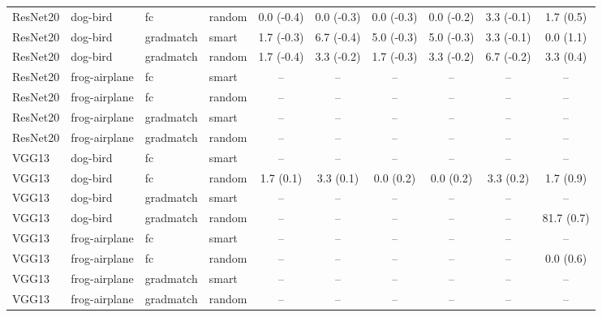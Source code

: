 \begin{table}[t]
{\begin{tabular}{llllcccccc}
ResNet20 & dog-bird & fc & random
& 0.0 (-0.4)
& 0.0 (-0.3)
& 0.0 (-0.3)
& 0.0 (-0.2)
& 3.3 (-0.1)
& 1.7 (0.5) \\ [1em]



ResNet20 & dog-bird & gradmatch & smart
& 1.7 (-0.3)
& 6.7 (-0.4)
& 5.0 (-0.3)
& 5.0 (-0.3)
& 3.3 (-0.1)
& 0.0 (1.1) \\
ResNet20 & dog-bird & gradmatch & random
& 1.7 (-0.4)
& 3.3 (-0.2)
& 1.7 (-0.3)
& 3.3 (-0.2)
& 6.7 (-0.2)
& 3.3 (0.4) \\


ResNet20 & frog-airplane & fc & smart
& --
& --
& --
& --
& --
& -- \\

ResNet20 & frog-airplane & fc & random
& --
& --
& --
& --
& --
& -- \\ [1em]



ResNet20 & frog-airplane & gradmatch & smart
& --
& --
& --
& --
& --
& -- \\

ResNet20 & frog-airplane & gradmatch & random
& --
& --
& --
& --
& --
& -- \\

\hline





VGG13 & dog-bird & fc & smart
& --
& --
& --
& --
& --
& -- \\
VGG13 & dog-bird & fc & random
& 1.7 (0.1)
& 3.3 (0.1)
& 0.0 (0.2)
& 0.0 (0.2)
& 3.3 (0.2)
& 1.7 (0.9) \\
\addlinespace

VGG13 & dog-bird & gradmatch & smart
& --
& --
& --
& --
& --
& -- \\

VGG13 & dog-bird & gradmatch & random
& --
& --
& --
& --
& --
& 81.7 (0.7) \\


VGG13 & frog-airplane & fc & smart
& --
& --
& --
& --
& --
& -- \\

VGG13 & frog-airplane & fc & random
& --
& --
& --
& --
& --
& 0.0 (0.6) \\ [1em]


VGG13 & frog-airplane & gradmatch & smart
& --
& --
& --
& --
& --
& -- \\

VGG13 & frog-airplane & gradmatch & random
& --
& --
& --
& --
& --
& -- \\

\hline
\end{tabular}
}
\end{table}
